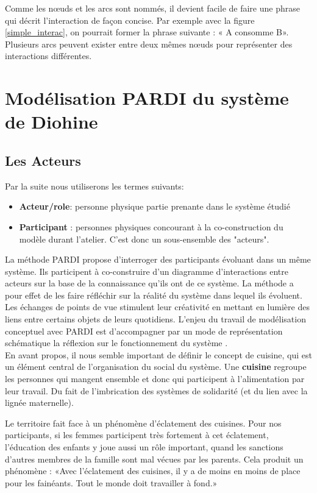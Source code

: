Comme les nœuds et les arcs sont nommés, il devient facile de faire une phrase qui décrit l'interaction de façon concise. Par exemple avec la figure \ref{simple_interac}, on pourrait former la phrase suivante : « A consomme B». Plusieurs arcs peuvent exister entre deux mêmes nœuds pour représenter des interactions différentes.

\section{Modélisation PARDI du système de Diohine}

\subsection{Les Acteurs}

Par la suite nous utiliserons les termes suivants:
\begin{itemize}
  \item \textbf{Acteur/role}: personne physique partie prenante dans le système étudié
  \item \textbf{Participant} : personnes physiques concourant à la co-construction du modèle durant l'atelier. C'est donc un sous-ensemble des "acteurs".
\end{itemize}

\vspace{0.5cm}

La méthode PARDI propose d'interroger des participants évoluant dans un même système. Ils participent à co-construire d'un diagramme d'interactions entre acteurs sur la base de la connaissance qu'ils ont de ce système. La méthode a pour effet de les faire réfléchir sur la réalité du système dans lequel ils évoluent. Les échanges de points de vue stimulent leur créativité en mettant en lumière des liens entre certains objets de leurs quotidiens. L'enjeu du travail de modélisation conceptuel avec PARDI est d'accompagner par un mode de représentation schématique la réflexion sur le fonctionnement du système \cite{becu_les_2010}.\\

En avant propos, il nous semble important de définir le concept de cuisine, qui est un élément central de l'organisation du social du système. Une \textbf{cuisine} regroupe les personnes qui mangent ensemble et donc qui participent à l’alimentation par leur travail. Du fait de l’imbrication des systèmes de solidarité (et du lien avec la lignée maternelle).

Le territoire fait face à un phénomène d’éclatement des cuisines.  Pour nos participants, si les femmes participent très fortement à cet éclatement, l'éducation des enfants y joue aussi un rôle important, quand les sanctions d'autres membres de la famille sont mal vécues par les parents. Cela produit un phénomène : «Avec l’éclatement des cuisines, il y a de moins en moins de place pour les fainéants. Tout le monde doit travailler à fond.»

